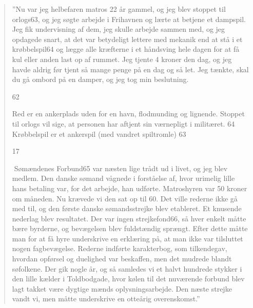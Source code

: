 \begin{quote}
''Nu var jeg helbefaren matros 22 år gammel, og jeg
blev stoppet til orlogs63, og jeg søgte arbejde i Frihavnen og lærte at
betjene et dampspil. Jeg fik undervisning af dem, jeg skulle arbejde
sammen med, og jeg opdagede snart, at det var betydeligt lettere med
mekanik end at stå i et krøbbelspil64 og lægge alle kræfterne i et
håndsving hele dagen for at få kul eller anden last op af rummet. Jeg
tjente 4 kroner den dag, og jeg havde aldrig før tjent så mange penge på
en dag og så let. Jeg tænkte, skal du gå ombord på en damper, og jeg tog
min beslutning.

62

Red er en ankerplads uden for en havn, flodmunding og lignende. Stoppet
til orlogs vil sige, at personen har aftjent sin værnepligt i militæret.
64 Krøbbelspil er et ankerspil (med vandret spiltromle) 63

17

Sømændenes Forbund65 var næsten lige trådt ud i livet, og jeg blev
medlem. Den danske sømand vågnede i forståelse af, hvor urimelig lille
hans betaling var, for det arbejde, han udførte. Matroshyren var 50
kroner om måneden. Nu krævede vi den sat op til 60. Det ville rederne
ikke gå med til, og den første danske sømandsstrejke blev etableret. Et
knusende nederlag blev resultatet. Der var ingen strejkefond66, så hver
enkelt måtte bære byrderne, og bevægelsen blev fuldstændig sprængt.
Efter dette måtte man for at få hyre underskrive en erklæring på, at man
ikke var tilsluttet nogen fagbevægelse. Rederne indførte karakterbog,
som tilkendegav, hvordan opførsel og duelighed var beskaffen, men det
mudrede blandt søfolkene. Der gik nogle år, og så samledes vi et halvt
hundrede stykker i den lille kælder i Toldbodgade, hvor kølen til det
nuværende forbund blev lagt takket være dygtige mænds oplysningsarbejde.
Den næste strejke vandt vi, men måtte underskrive en otteårig
overenskomst.''
\end{quote}
